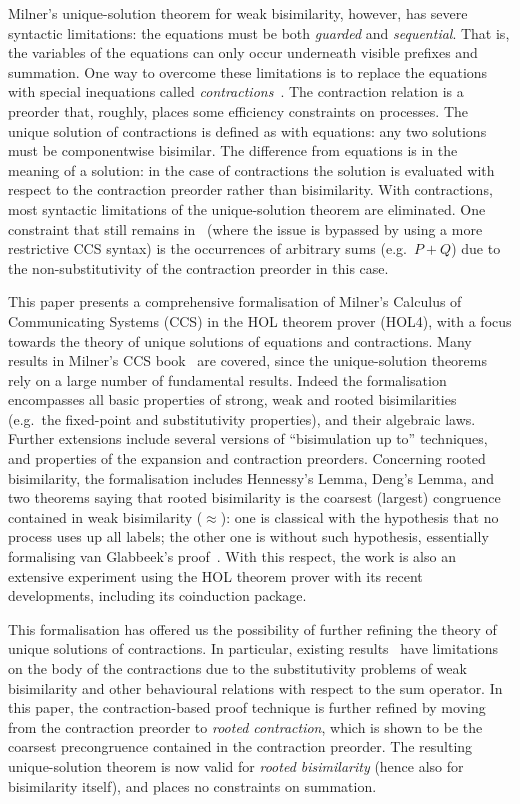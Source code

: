 \documentclass[GCNS]{yincog}
\theoremstyle{remark}
\theoremstyle{theorem}
\theoremstyle{remark}
\newcommand{\wbvtex}{\approx}
\begin{document}
Milner's unique-solution theorem for weak bisimilarity, however, has severe
syntactic limitations: the equations must be both \emph{guarded} and
\emph{sequential}. That is, the variables of the equations can only occur
underneath visible prefixes and summation. One way to overcome these limitations
is to replace the equations with special inequations called
\emph{contractions}~\cite{sangiorgi2015equations,sangiorgi2017equations}.
The contraction relation is a preorder that, roughly, places some efficiency
constraints on processes. The unique solution of contractions is defined
as with equations: any two solutions must be componentwise bisimilar. The
difference from equations is in the meaning of a solution: in the case
of contractions the solution is evaluated with respect to the contraction
preorder rather than bisimilarity. With contractions, most syntactic limitations
of the unique-solution theorem are eliminated. One constraint that still
remains in~\cite{sangiorgi2017equations} (where the issue is bypassed by
using a more restrictive CCS syntax) is the occurrences of arbitrary sums
(e.g.~$P + Q$) due to the non-substitutivity of the contraction preorder
in this case.

This paper presents a comprehensive formalisation of Milner's Calculus
of Communicating Systems (CCS) in the HOL theorem prover (HOL4), with a
focus towards the theory of unique solutions of equations and contractions.
Many results in Milner's CCS book~\cite{Mil89} are covered, since the unique-solution
theorems rely on a large number of fundamental results. Indeed the formalisation
encompasses all basic properties of strong, weak and rooted bisimilarities
(e.g.~the fixed-point and substitutivity properties), and their algebraic
laws. Further extensions include several versions of ``bisimulation up
to'' techniques, and properties of the expansion and contraction preorders.
Concerning rooted bisimilarity, the formalisation includes Hennessy's Lemma,
Deng's Lemma, and two theorems saying that rooted bisimilarity is the coarsest
(largest) congruence contained in weak bisimilarity ($\wbvtex $): one is
classical with the hypothesis that no process uses up all labels; the other
one is without such hypothesis, essentially formalising van Glabbeek's
proof~\cite{van2005characterisation}. With this respect, the work is also
an extensive experiment using the HOL theorem prover with its recent developments,
including its coinduction package.

This formalisation has offered us the possibility of further refining the
theory of unique solutions of contractions. In particular, existing results~\cite{sangiorgi2017equations}
have limitations on the body of the contractions due to the substitutivity
problems of weak bisimilarity and other behavioural relations with respect
to the sum operator. In this paper, the contraction-based proof technique
is further refined by moving from the contraction preorder to
\emph{rooted contraction}, which is shown to be the coarsest precongruence
contained in the contraction preorder. The resulting unique-solution theorem
is now valid for \emph{rooted bisimilarity} (hence also for bisimilarity
itself), and places no constraints on summation.
\end{document}

